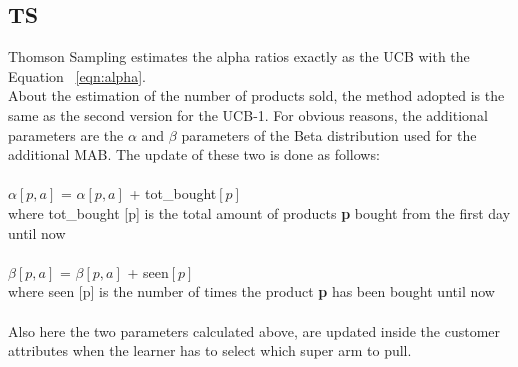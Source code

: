 \subsection{TS}
Thomson Sampling estimates the alpha ratios exactly as the UCB with the Equation ~\ref{eqn:alpha}.\\About the estimation of the number of products sold, the method adopted is the same as the second version for the UCB-1. For obvious reasons, the additional parameters are the $\alpha$ and $\beta$ parameters of the Beta distribution used for the additional MAB. The update of these two is done as follows:\\\\
$\alpha[p, a]$ = $\alpha[p, a]$ + tot\_bought$[p]$\\
where tot\_bought [p] is the total amount of products {\bf p} bought from the first day until now\\\\
$\beta[p, a]$ = $\beta [p, a]$ + seen$[p]$\\
where seen [p] is the number of times the product {\bf p} has been bought until now\\\\
Also here the two parameters calculated above, are updated inside the customer attributes when the learner has to select which super arm to pull.

